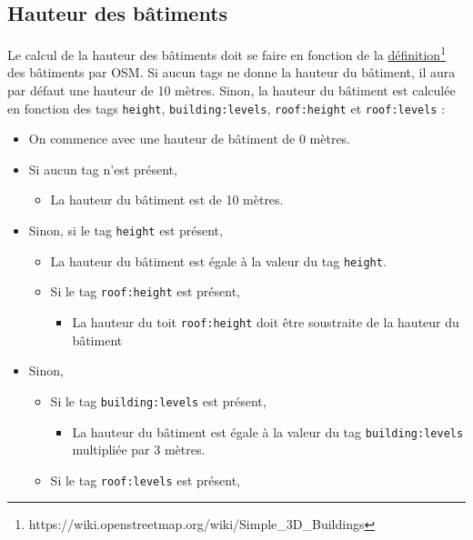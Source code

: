 \newpage
\subsection{Hauteur des bâtiments}

Le calcul de la hauteur des bâtiments doit se faire en fonction de la \href{https://wiki.openstreetmap.org/wiki/Simple_3D_Buildings}{définition}\footnote{https://wiki.openstreetmap.org/wiki/Simple\_3D\_Buildings} des bâtiments par OSM. Si aucun tags ne donne la hauteur du bâtiment, il aura par défaut une hauteur de 10 mètres. Sinon, la hauteur du bâtiment est calculée en fonction des tags \texttt{height}, \texttt{building:levels}, \texttt{roof:height} et \texttt{roof:levels} :

\begin{itemize}
    \item On commence avec une hauteur de bâtiment de 0 mètres.
    \item Si aucun tag n'est présent,
          \begin{itemize}
              \item La hauteur du bâtiment est de 10 mètres.
          \end{itemize}
    \item Sinon, si le tag \texttt{height} est présent,
          \begin{itemize}
              \item La hauteur du bâtiment est égale à la valeur du tag \texttt{height}.
              \item Si le tag \texttt{roof:height} est présent,
                    \begin{itemize}
                        \item La hauteur du toit \texttt{roof:height} doit être soustraite de la hauteur du bâtiment
                    \end{itemize}
          \end{itemize}
    \item Sinon,
          \begin{itemize}
              \item Si le tag \texttt{building:levels} est présent,
                    \begin{itemize}
                        \item La hauteur du bâtiment est égale à la valeur du tag \texttt{building:levels} multipliée par 3 mètres.
                    \end{itemize}
              \item Si le tag \texttt{roof:levels} est présent,

\end{itemize}
\end{itemize}
